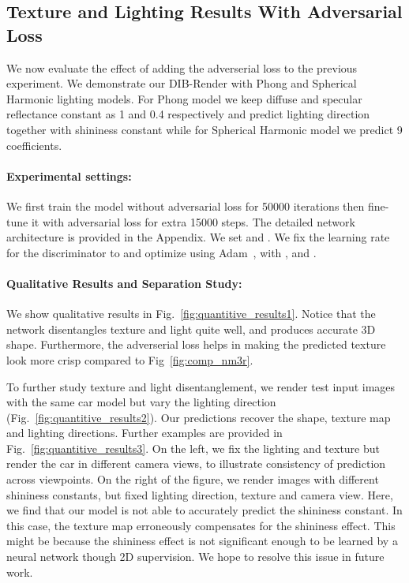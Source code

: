 \documentclass{article}
\begin{document}
\begin{minipage}[t] {0.09\textwidth}
\vspace{-5pt}
\subsection{Texture and Lighting Results With Adversarial Loss}
\vspace{-5pt}
We now evaluate the effect of adding the adverserial loss to the previous experiment.  We demonstrate our DIB-Render with Phong and Spherical Harmonic lighting models. For Phong model we keep diffuse and specular reflectance constant as 1 and 0.4 respectively and predict lighting direction together with shininess constant  while for Spherical Harmonic model we predict 9 coefficients.

\vspace{-4mm}
\paragraph{Experimental settings:} We first train the model without adversarial loss for 50000 iterations then  fine-tune it with adversarial loss for extra 15000 steps. The detailed network architecture is provided in the Appendix. We set  and . We fix the learning rate for the discriminator to  and optimize using Adam~\cite{kingma2014adam}, with , and .
\vspace{-5pt}
\vspace{-3mm}
\paragraph{Qualitative Results and Separation Study:}
We show qualitative results in Fig.~\ref{fig:quantitive_results1}. Notice that the network disentangles texture and light quite well, and produces accurate 3D shape. Furthermore, the adverserial loss helps in making the predicted texture look more crisp compared to Fig~\ref{fig:comp_nm3r}. 

To further study texture and light disentanglement, we render test input images with the same car model but vary the lighting direction (Fig.~\ref{fig:quantitive_results2}). Our predictions recover the shape, texture map and  lighting directions. 
Further examples are provided in Fig.~\ref{fig:quantitive_results3}. On the left, we fix the lighting and texture but render the car in different camera views, to illustrate consistency of prediction across viewpoints. On the right of the figure, we render images with different shininess constants, but fixed lighting direction, texture and camera view. Here, we find that our model is not able to accurately predict the shininess constant. 
In this case, the texture map erroneously compensates for the shininess effect. This might be because the shininess effect is not significant enough to be learned by a neural network though 2D supervision. We hope to resolve this issue in future work.


\end{minipage}
\end{document}
